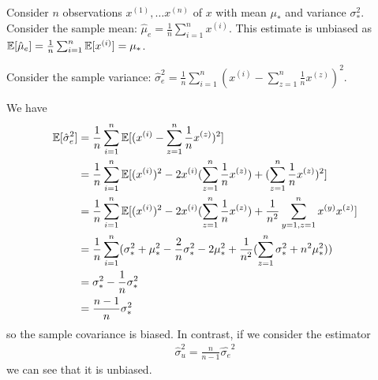 \begin{example}
  \label{ex:biased:var}
  Consider $n$ observations $x^{(1)},
  \dots x^{(n)}$ of $x$ with mean $\mu_*$ and variance $\sigma_*^2$.
  Consider the sample mean: $\hat{\mu}_e = \frac1{n}
  \sum_{i=1}^n x^{(i)}$. This estimate is unbiased as $\mathbb{E}[\hat{\mu}_e] = \frac1{n}
  \sum_{i=1}^n \mathbb{E}[x^{(i)}] = \mu_*$.
  

  Consider the sample variance:
  $\hat{\sigma}_e^2 = \frac1{n} \sum_{i=1}^n (x^{(i)} - \sum_{z=1}^n \frac1{n} x^{(z)})^2$. 

  We have
  \begin{align}
    \mathbb{E}[\hat{\sigma}_e^2] &= \frac1{n} \sum_{i=1}^n \mathbb{E}[ (x^{(i)} - \sum_{z=1}^n \frac1{n} x^{(z)})^2] \\
                        &= \frac1{n} \sum_{i=1}^n \mathbb{E} [(x^{(i)})^2 - 2 x^{(i)} (\sum_{z=1}^n \frac1{n} x^{(z)} ) +(\sum_{z=1}^n \frac1{n} x^{(z)} )^2] \\
                        &= \frac1{n} \sum_{i=1}^n \mathbb{E} [(x^{(i)})^2 - 2 x^{(i)} (\sum_{z=1}^n \frac1{n} x^{(z)} ) + \frac1{n^2}\sum_{y=1, z=1}^n  x^{(y)} x^{(z)} ] \\
                        &= \frac1{n} \sum_{i=1}^n (\sigma_*^2 + \mu_*^2 - \frac{2}{n}\sigma_*^2 -2\mu_*^2 +  \frac1{n^2} (\sum_{z=1}^n \sigma_*^2 + n^2 \mu_*^2)) \\
                        &= \sigma_*^2 - \frac1{n} \sigma_*^2 \\
                        &= \frac{n-1}{n}\sigma_*^2
  \end{align}
  so the sample covariance is biased.
  In contrast, if we consider the estimator
  \begin{align}
    \hat{\sigma}_u^2 = \frac{n}{n-1}\hat{\sigma_e}^2
  \end{align}
  we can see that it is unbiased.
\end{example}

